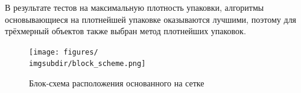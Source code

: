 В результате тестов на максимальную плотность упаковки, алгоритмы основывающиеся на плотнейшей упаковке оказываются лучшими, поэтому для трёхмерный объектов также выбран метод плотнейших упаковок.

\newcommand{\imgsubdir}{tight_packing}
\begin{figure}[h!]
    \centering
    \texttt{[image: figures/\\imgsubdir/block\_scheme.png]}
    \caption{Блок-схема расположения основанного на сетке}
    \label{fig:my_label}
\end{figure}
